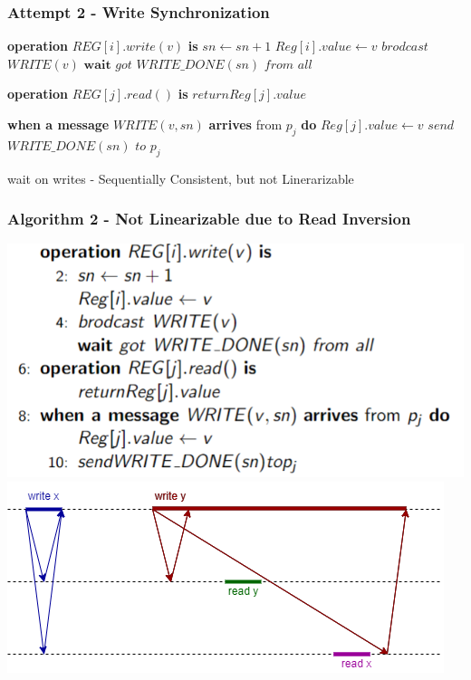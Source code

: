 \begin{frame}[fragile]
    \frametitle{Attempt 2 - Write Synchronization}
    \begin{algorithm}[H]
        \begin{algorithmic}[0]
            \STATE \textbf{operation} $REG[i].write(v)$ \textbf{is}
            \bindent
                \STATE $sn\leftarrow sn+1$
                \STATE $Reg[i].value \leftarrow v$
                \STATE $brodcast$ $WRITE(v)$
                \STATE $\textbf{wait}$ $got$ $WRITE\_DONE(sn)$ $from$ $all$
            \eindent

            \STATE \textbf{operation} $REG[j].read()$ \textbf{is}
            \bindent
                \STATE $return Reg[j].value$
            \eindent
            
            \STATE \textbf{when a message} $WRITE(v, sn)$ \textbf{arrives} from $p_j$ \textbf{do}
            \bindent
                \STATE $Reg[j].value \leftarrow v$
                \STATE $send$ $WRITE\_DONE(sn)$ $to$ $p_j$
            \eindent

        \end{algorithmic}
        \caption{wait on writes - Sequentially Consistent, but not Linerarizable}
        \label{alg:seq}
    \end{algorithm}
\end{frame}

\begin{frame}
    \frametitle{Algorithm 2 - Not Linearizable due to Read Inversion}
    \begin{center}
        \includegraphics[scale=.63]{resources/alg2_src.png}
        \includegraphics[scale=.5]{resources/alg2_incorrectness.png}
    \end{center}
\end{frame}

